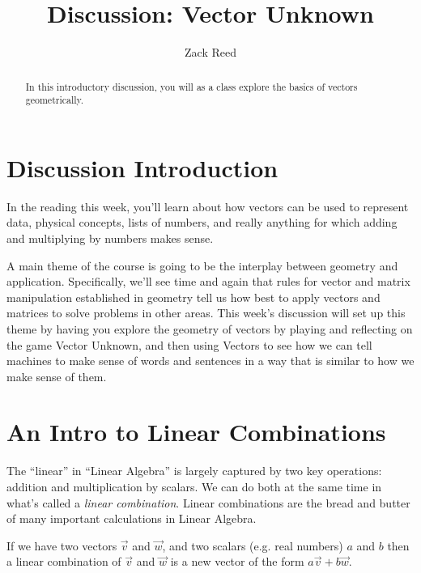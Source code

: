 \documentclass{ximera}
\author{Zack Reed}
\title{Discussion: Vector Unknown}
\begin{document}
\begin{abstract}

    In this introductory discussion, you will as a class explore the basics of vectors geometrically.

\end{abstract}
\maketitle


\section{Discussion Introduction}

  In the reading this week, you'll learn about how vectors can be used to represent data, physical concepts, lists of numbers, and really anything for which adding and multiplying by numbers makes sense. 
  
  A main theme of the course is going to be the interplay between geometry and application. Specifically, we'll see time and again that rules for vector and matrix manipulation established in geometry tell us how best to apply vectors and matrices to solve problems in other areas. This week's discussion will set up this theme by having you explore the geometry of vectors by playing and reflecting on the game Vector Unknown, and then using Vectors to see how we can tell machines to make sense of words and sentences in a way that is similar to how we make sense of them.

\section{An Intro to Linear Combinations}

  The ``linear'' in  ``Linear Algebra'' is largely captured by two key operations: addition and multiplication by scalars. We can do both at the same time in what's called a \emph{linear combination}. Linear combinations are the bread and butter of many important calculations in Linear Algebra. 

  If we have two vectors $\vec{v}$ and $\vec{w}$, and two scalars (e.g. real numbers) $a$ and $b$ then a linear combination of $\vec{v}$ and $\vec{w}$ is a new vector of the form $a\vec{v} + b\vec{w}$.
\end{document}
